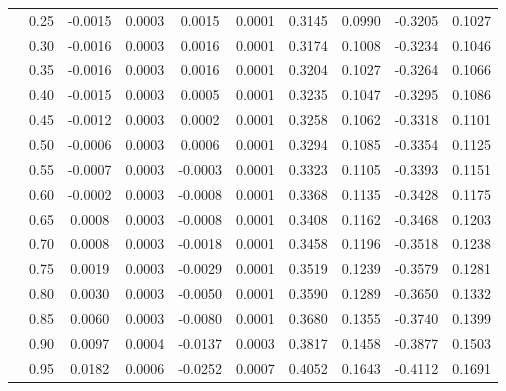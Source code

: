 \begin{table}[H]
\begin{tabular}{cccccccccc}
   & 0.25 & -0.0015 & 0.0003 & 0.0015 & 0.0001 & 0.3145 & 0.0990 & -0.3205 & 0.1027 \\ 
   & 0.30 & -0.0016 & 0.0003 & 0.0016 & 0.0001 & 0.3174 & 0.1008 & -0.3234 & 0.1046 \\ 
   & 0.35 & -0.0016 & 0.0003 & 0.0016 & 0.0001 & 0.3204 & 0.1027 & -0.3264 & 0.1066 \\ 
   & 0.40 & -0.0015 & 0.0003 & 0.0005 & 0.0001 & 0.3235 & 0.1047 & -0.3295 & 0.1086 \\ 
   & 0.45 & -0.0012 & 0.0003 & 0.0002 & 0.0001 & 0.3258 & 0.1062 & -0.3318 & 0.1101 \\ 
   & 0.50 & -0.0006 & 0.0003 & 0.0006 & 0.0001 & 0.3294 & 0.1085 & -0.3354 & 0.1125 \\ 
   & 0.55 & -0.0007 & 0.0003 & -0.0003 & 0.0001 & 0.3323 & 0.1105 & -0.3393 & 0.1151 \\ 
   & 0.60 & -0.0002 & 0.0003 & -0.0008 & 0.0001 & 0.3368 & 0.1135 & -0.3428 & 0.1175 \\ 
   & 0.65 & 0.0008 & 0.0003 & -0.0008 & 0.0001 & 0.3408 & 0.1162 & -0.3468 & 0.1203 \\ 
   & 0.70 & 0.0008 & 0.0003 & -0.0018 & 0.0001 & 0.3458 & 0.1196 & -0.3518 & 0.1238 \\ 
   & 0.75 & 0.0019 & 0.0003 & -0.0029 & 0.0001 & 0.3519 & 0.1239 & -0.3579 & 0.1281 \\ 
   & 0.80 & 0.0030 & 0.0003 & -0.0050 & 0.0001 & 0.3590 & 0.1289 & -0.3650 & 0.1332 \\ 
   & 0.85 & 0.0060 & 0.0003 & -0.0080 & 0.0001 & 0.3680 & 0.1355 & -0.3740 & 0.1399 \\ 
   & 0.90 & 0.0097 & 0.0004 & -0.0137 & 0.0003 & 0.3817 & 0.1458 & -0.3877 & 0.1503 \\ 
   & 0.95 & 0.0182 & 0.0006 & -0.0252 & 0.0007 & 0.4052 & 0.1643 & -0.4112 & 0.1691 \\ 
   \hline
\end{tabular}
\end{table}
